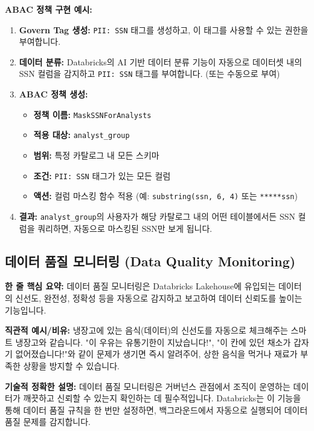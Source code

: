 \documentclass[11pt,a4paper]{article}
\theoremstyle{definition}
\begin{document}
\begin{examplebox}
\textbf{ABAC 정책 구현 예시:}
\begin{enumerate}
    \item \textbf{Govern Tag 생성:} \texttt{PII: SSN} 태그를 생성하고, 이 태그를 사용할 수 있는 권한을 부여합니다.
    \item \textbf{데이터 분류:} Databricks의 AI 기반 데이터 분류 기능이 자동으로 데이터셋 내의 SSN 컬럼을 감지하고 \texttt{PII: SSN} 태그를 부여합니다. (또는 수동으로 부여)
    \item \textbf{ABAC 정책 생성:}
    \begin{itemize}
        \item \textbf{정책 이름:} \texttt{MaskSSNForAnalysts}
        \item \textbf{적용 대상:} \texttt{analyst\_group}
        \item \textbf{범위:} 특정 카탈로그 내 모든 스키마
        \item \textbf{조건:} \texttt{PII: SSN} 태그가 있는 모든 컬럼
        \item \textbf{액션:} 컬럼 마스킹 함수 적용 (예: \texttt{substring(ssn, 6, 4)} 또는 \texttt{*****ssn})
    \end{itemize}
    \item \textbf{결과:} \texttt{analyst\_group}의 사용자가 해당 카탈로그 내의 어떤 테이블에서든 SSN 컬럼을 쿼리하면, 자동으로 마스킹된 SSN만 보게 됩니다.
\end{enumerate}
\end{examplebox}

\newpage
\subsection*{데이터 품질 모니터링 (Data Quality Monitoring)}

\begin{keyconceptbox}
\textbf{한 줄 핵심 요약:} 데이터 품질 모니터링은 Databricks Lakehouse에 유입되는 데이터의 신선도, 완전성, 정확성 등을 자동으로 감지하고 보고하여 데이터 신뢰도를 높이는 기능입니다.
\end{keyconceptbox}

\textbf{직관적 예시/비유:}
냉장고에 있는 음식(데이터)의 신선도를 자동으로 체크해주는 스마트 냉장고와 같습니다. "이 우유는 유통기한이 지났습니다!", "이 칸에 있던 채소가 갑자기 없어졌습니다!"와 같이 문제가 생기면 즉시 알려주어, 상한 음식을 먹거나 재료가 부족한 상황을 방지할 수 있습니다.

\textbf{기술적 정확한 설명:}
데이터 품질 모니터링은 거버넌스 관점에서 조직이 운영하는 데이터가 깨끗하고 신뢰할 수 있는지 확인하는 데 필수적입니다. Databricks는 이 기능을 통해 데이터 품질 규칙을 한 번만 설정하면, 백그라운드에서 자동으로 실행되어 데이터 품질 문제를 감지합니다.
\end{document}
